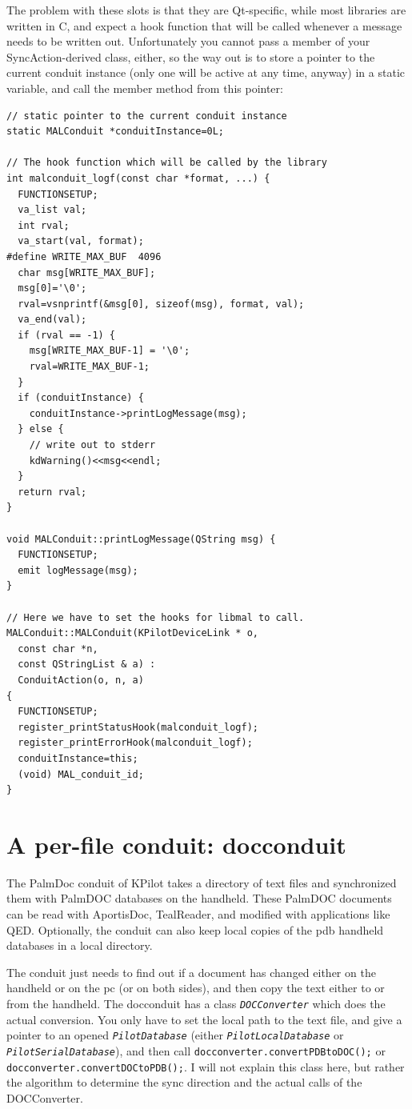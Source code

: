 \documentclass[10pt,a4paper]{article}
\newcommand{\code}[1]{{\small\texttt{#1}}}
\newcommand{\class}[1]{{\small\em\texttt{#1}}}
\begin{document}
The problem with these slots is that they are Qt-specific, while most libraries are written in C, and expect a hook function that will be called whenever a message needs to be written out. Unfortunately you cannot pass a member of your SyncAction-derived class, either, so the way out is to store a pointer to the current conduit instance (only one will be active at any time, anyway) in a static variable, and call the member method from this pointer:

{\footnotesize
\begin{verbatim}
// static pointer to the current conduit instance
static MALConduit *conduitInstance=0L;

// The hook function which will be called by the library
int malconduit_logf(const char *format, ...) {
  FUNCTIONSETUP;
  va_list val;
  int rval;
  va_start(val, format);
#define WRITE_MAX_BUF  4096
  char msg[WRITE_MAX_BUF];
  msg[0]='\0';
  rval=vsnprintf(&msg[0], sizeof(msg), format, val);
  va_end(val);
  if (rval == -1) {
    msg[WRITE_MAX_BUF-1] = '\0';
    rval=WRITE_MAX_BUF-1;
  }
  if (conduitInstance) {
    conduitInstance->printLogMessage(msg);
  } else {
    // write out to stderr
    kdWarning()<<msg<<endl;
  }
  return rval;
}

void MALConduit::printLogMessage(QString msg) {
  FUNCTIONSETUP;
  emit logMessage(msg);
}

// Here we have to set the hooks for libmal to call.
MALConduit::MALConduit(KPilotDeviceLink * o,
  const char *n, 
  const QStringList & a) :
  ConduitAction(o, n, a)
{
  FUNCTIONSETUP;
  register_printStatusHook(malconduit_logf);
  register_printErrorHook(malconduit_logf);
  conduitInstance=this;
  (void) MAL_conduit_id;
}
\end{verbatim}
}



\section{A per-file conduit: docconduit}\label{SectionDatabasesConduit}

The PalmDoc conduit of KPilot takes a directory of text files and synchronized them with PalmDOC databases on the handheld. These PalmDOC documents can be read with AportisDoc, TealReader, and modified with applications like QED. Optionally, the conduit can also keep local copies of the pdb handheld databases in a local directory.

The conduit just needs to find out if a document has changed either on the handheld or on the pc (or on both sides), and then copy the text either to or from the handheld. The docconduit has a class \class{DOCConverter} which does the actual conversion. You only have to set the local path to the text file, and give a pointer to an opened \class{PilotDatabase} (either \class{PilotLocalDatabase} or \class{PilotSerialDatabase}), and then call 
\code{docconverter.convertPDBtoDOC();} or \code{docconverter.convertDOCtoPDB();}. I will not explain this class here, but rather the algorithm to determine the sync direction and the actual calls of the DOCConverter. 
\end{document}
